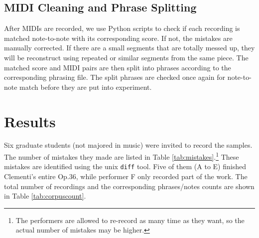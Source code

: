 \subsection{MIDI Cleaning and Phrase Splitting}
  After MIDIs are recorded, we use Python scripts to check if each recording is matched note-to-note with its corresponding score. If not, the mistakes are manually corrected. %
  If there are a small segments that are totally messed up, they will be reconstruct using repeated or similar segments from the same piece. The matched score and MIDI pairs are then split into phrases according to the corresponding phrasing file. The split phrases are checked once again for note-to-note match before they are put into experiment.

\section{Results}
Six graduate students (not majored in music) were invited to record the samples. The number of mistakes they made are listed in Table \ref{tab:mistakes}.\footnote{The performers are allowed to re-record as many time as they want, so the actual number of mistakes may be higher.} These mistakes are identified using the unix \texttt{diff}\cite{diff} tool. Five of them (A to E) finished Clementi's entire Op.36, while performer F only recorded part of the work. The total number of recordings and the corresponding phrases/notes counts are shown in Table \ref{tab:corpuscount}. 

